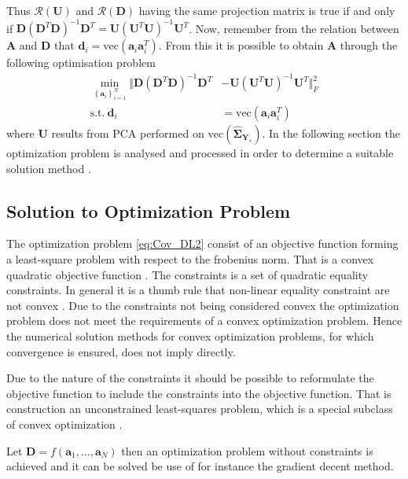 Thus $\mathcal{R}(\textbf{U})$ and $\mathcal{R}(\textbf{D})$ having the same projection matrix is true if and only if $\textbf{D}(\textbf{D}^T\textbf{D})^{-1}\textbf{D}^T=\textbf{U}(\textbf{U}^T\textbf{U})^{-1}\textbf{U}^T$. 
Now, remember from the relation between $\textbf{A}$ and $\textbf{D}$ that $\textbf{d}_i = \text{vec}(\textbf{a}_i\textbf{a}_i^T)$. 
From this it is possible to obtain $\textbf{A}$ through the following optimisation problem 
\begin{align}
\min_{\left\{\textbf{a}_i\right\}_{i = 1}^{N}}\Vert  \textbf{D}(\textbf{D}^T\textbf{D})^{-1}\textbf{D}^T &- \textbf{U}(\textbf{U}^T\textbf{U})^{-1}\textbf{U}^T \Vert_{F}^{2} \nonumber \\
\text{s.t.} \ \textbf{d}_i&=\text{vec}(\textbf{a}_i\textbf{a}_i^T)\label{eq:Cov_DL2}
\end{align}      
where $\textbf{U}$ results from PCA performed on $\text{vec}(\widehat{\boldsymbol{\Sigma}}_{\textbf{Y}_s})$.
In the following section the optimization problem is analysed and processed in order to determine a suitable solution method . 

\subsection{Solution to Optimization Problem}
The optimization problem \eqref{eq:Cov_DL2} consist of an objective function forming a least-square problem with respect to the frobenius norm.
That is a convex quadratic objective function .
The constraints is a set of quadratic equality constraints. In general it is a thumb rule that non-linear equality constraint are not convex .
Due to the constraints not being considered convex the optimization problem does not meet the requirements of a convex optimization problem. Hence the numerical solution methods for convex optimization problems, for which convergence is ensured, does not imply directly. 

Due to the nature of the constraints it should be possible to reformulate the objective function to include the constraints into the objective function. That is construction an unconstrained least-squares problem, which is a special subclass of convex optimization \cite{cvxbook}.

Let $\textbf{D} = f(\textbf{a}_1, \hdots, \textbf{a}_N)$ then an optimization problem without constraints is achieved and it can be solved be use of for instance the gradient decent method.

